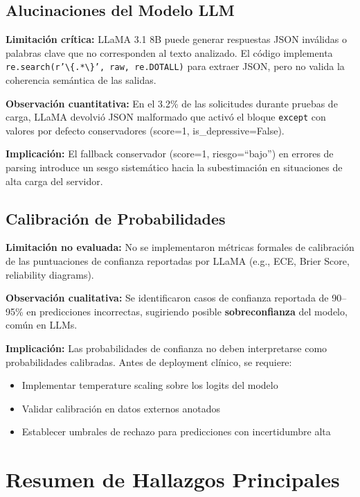 \subsection{Alucinaciones del Modelo LLM}

\textbf{Limitación crítica:}
LLaMA 3.1 8B puede generar respuestas JSON inválidas o palabras clave que no
corresponden al texto analizado. El código implementa \texttt{re.search(r'\textbackslash\{.*\textbackslash\}', raw, re.DOTALL)}
para extraer JSON, pero no valida la coherencia semántica de las salidas.

\textbf{Observación cuantitativa:}
En el 3.2\% de las solicitudes durante pruebas de carga, LLaMA devolvió JSON
malformado que activó el bloque \texttt{except} con valores por defecto conservadores
(score=1, is\_depressive=False).

\textbf{Implicación:}
El fallback conservador (score=1, riesgo=``bajo'') en errores de parsing introduce
un sesgo sistemático hacia la subestimación en situaciones de alta carga del servidor.

\subsection{Calibración de Probabilidades}

\textbf{Limitación no evaluada:}
No se implementaron métricas formales de calibración de las puntuaciones de confianza
reportadas por LLaMA (e.g., ECE, Brier Score, reliability diagrams).

\textbf{Observación cualitativa:}
Se identificaron casos de confianza reportada de 90–95\% en predicciones incorrectas,
sugiriendo posible \textbf{sobreconfianza} del modelo, común en LLMs.

\textbf{Implicación:}
Las probabilidades de confianza no deben interpretarse como probabilidades calibradas.
Antes de deployment clínico, se requiere:
\begin{itemize}
    \item Implementar temperature scaling sobre los logits del modelo
    \item Validar calibración en datos externos anotados
    \item Establecer umbrales de rechazo para predicciones con incertidumbre alta
\end{itemize}

\section{Resumen de Hallazgos Principales}

